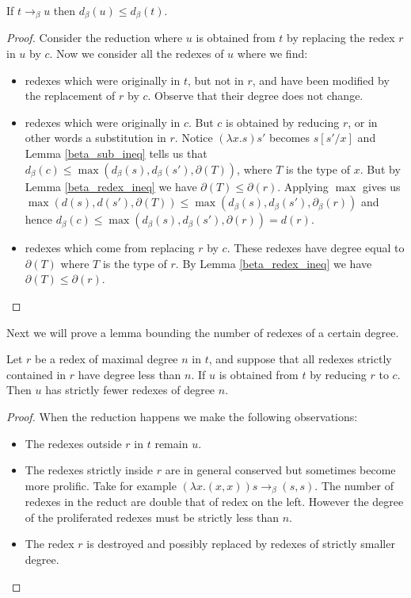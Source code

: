 \begin{lemma}\label{beta_reduct_ineq}
    If $t \to_{\beta} u$ then $d_{\beta}(u) \le d_{\beta}(t)$.    
\end{lemma}

\begin{proof}
    Consider the reduction where $u$ is obtained from $t$ by replacing the redex $r$ in $u$ by $c$. Now we consider all the redexes of $u$ where we find:
    \begin{itemize}
        \item redexes which were originally in $t$, but not in $r$, and have been modified by the replacement of $r$ by $c$. Observe that their degree does not change.
        \item redexes which were originally in $c$. But $c$ is obtained by reducing $r$, or in other words a substitution in $r$. Notice $(\lambda x . s)s'$ becomes $s[s'/x]$ and Lemma \ref{beta_sub_ineq} tells us that $d_{\beta}(c) \le \max(d_{\beta}(s), d_{\beta}(s'), \partial(T))$, where $T$ is the type of $x$. But by Lemma \ref{beta_redex_ineq} we have $\partial (T) \le \partial (r)$. Applying $\max$ gives us $\max(d(s), d(s'), \partial(T)) \le \max(d_{\beta}(s), d_{\beta}(s'), \partial_{\beta}(r))$ and hence $d_{\beta}(c) \le \max(d_{\beta}(s), d_{\beta}(s'), \partial(r))=d(r)$.
        \item redexes which come from replacing $r$ by $c$. These redexes have degree equal to $\partial(T)$ where $T$ is the type of $r$. By Lemma \ref{beta_redex_ineq} we have $\partial(T) \le \partial (r)$.
    \end{itemize}
\end{proof}

Next we will prove a lemma bounding the number of redexes of a certain degree.

\begin{lemma}\label{beta_redex_number_ineq}
    Let $r$ be a redex of maximal degree $n$ in $t$, and suppose that all redexes strictly contained in $r$ have degree less than $n$. If $u$ is obtained from $t$ by reducing $r$ to $c$. Then $u$ has strictly fewer redexes of degree $n$.
\end{lemma}

\begin{proof}
    When the reduction happens we make the following observations:
    \begin{itemize}
        \item The redexes outside $r$ in $t$ remain $u$.
        \item The redexes strictly inside $r$ are in general conserved but sometimes become more prolific. Take for example $(\lambda x . (x, x)) s \to_{\beta} (s, s)$. The number of redexes in the reduct are double that of redex on the left. However the degree of the proliferated redexes must be strictly less than $n$.
        \item The redex $r$ is destroyed and possibly replaced by redexes of strictly smaller degree.
    \end{itemize}
\end{proof}

